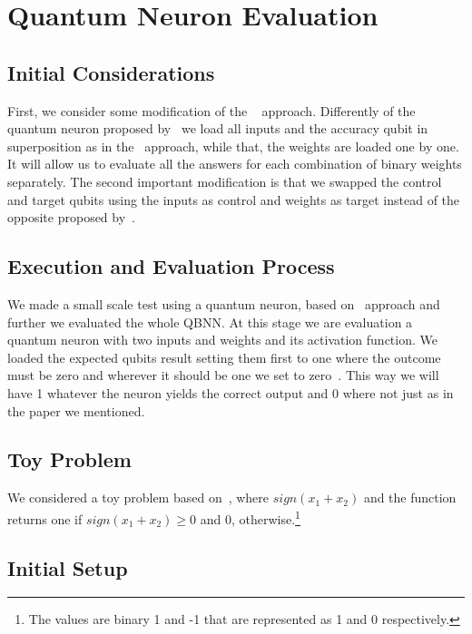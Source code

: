 \documentclass[conference]{IEEEtran}
\begin{document}
\section{Quantum Neuron Evaluation}\label{sec:quantum-neuron-evaluation}

\subsection{Initial Considerations}\label{subsec:initial-considerations}

 First, we consider some modification of the ~\cite{fawaz2019training} approach.
Differently of the quantum neuron proposed by~\cite{fawaz2019training} we load all inputs and the accuracy qubit in
superposition as in the~\cite{Trugenberger_2001} approach, while that, the weights are loaded one by one.
It will allow us to evaluate all the answers for each combination of binary weights separately.
The second important modification is that we swapped the control and target qubits using the inputs as control and
weights as target instead of the opposite proposed by~\cite{fawaz2019training}.

\subsection{Execution and Evaluation Process}\label{subsec:execution-and-evaluation-process}

 We made a small scale test using a quantum neuron, based on~\cite{fawaz2019training} approach and further we evaluated
 the whole QBNN\@.
 At this stage we are evaluation a quantum neuron with two inputs and weights and its activation function.
 We loaded the expected qubits result setting them first to one where the outcome must be zero and wherever it should
 be one we set to zero~\cite{fawaz2019training}.
 This way we will have 1 whatever the neuron yields the correct output and 0 where not just as in the paper we mentioned.

 \subsection*{Toy Problem}
    We considered a toy problem based on~\cite{fawaz2019training}, where \(sign(x_1 + x_2)\) and the function returns one
    if \(sign(x_1 + x_2) \geq 0\) and 0, otherwise.\footnote{The values are binary 1 and -1 that are represented as 1
    and 0 respectively.}

\subsection{Initial Setup}\label{subsec:initial-setup}
\end{document}
